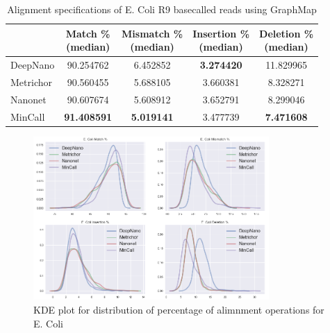 \documentclass[runningheads,a4paper]{llncs}
\begin{document}
\begin{table}[]
    \caption{Alignment specifications of E. Coli R9 basecalled reads using GraphMap}
    \label{tbl:ecoli_rates}
    \centering
    \begin{tabular}{lcccc}
        \toprule
        {} &  \thead{Match \% \\(median)} &  \thead{Mismatch \% \\(median)} &  \thead{Insertion \% \\(median)} &  \thead{Deletion \% \\(median)} \\
        \midrule
        DeepNano   &                  90.254762 &                      6.452852 &                       \textbf{3.274420} &                     11.829965 \\
        Metrichor  &                  90.560455 &                      5.688105 &                       3.660381 &                      8.328271 \\
        Nanonet    &                  90.607674 &                      5.608912 &                       3.652791 &                      8.299046 \\
        MinCall    &                  \textbf{91.408591} &                     \textbf{ 5.019141} &                       3.477739 &                      \textbf{7.471608 }\\
        \bottomrule
    \end{tabular}
\end{table}

\begin{figure}[]
    \begin{center}
        \includegraphics[width=0.8\textwidth]{./imgs/results/ecoli/kde_cigar.png}
        \caption{KDE plot for distribution of percentage of alimnment operations for E. Coli}
        \label{fg:ecoli_kde}
    \end{center}
\end{figure}
\end{document}
